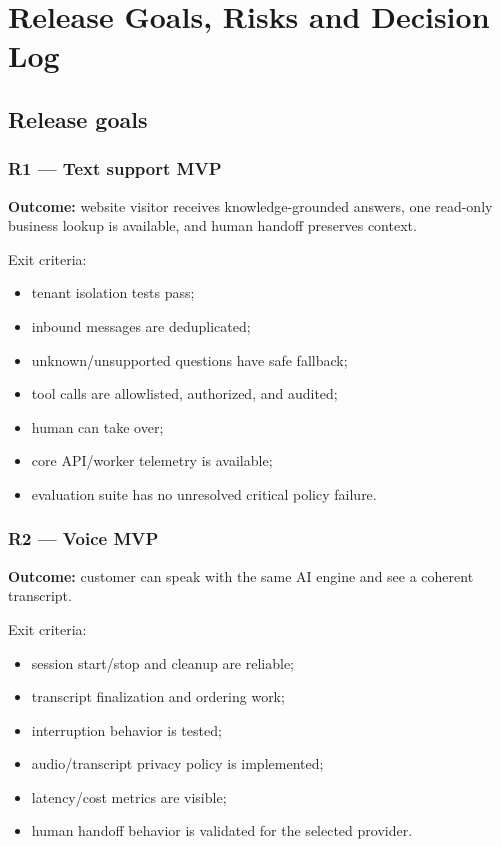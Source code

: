 \chapter{Release Goals, Risks and Decision Log}

\section{Release goals}

\subsection{R1 --- Text support MVP}

\textbf{Outcome:} website visitor receives knowledge-grounded answers, one read-only business lookup is available, and human handoff preserves context.

Exit criteria:

\begin{itemize}
\item tenant isolation tests pass;
\item inbound messages are deduplicated;
\item unknown/unsupported questions have safe fallback;
\item tool calls are allowlisted, authorized, and audited;
\item human can take over;
\item core API/worker telemetry is available;
\item evaluation suite has no unresolved critical policy failure.
\end{itemize}


\subsection{R2 --- Voice MVP}

\textbf{Outcome:} customer can speak with the same AI engine and see a coherent transcript.

Exit criteria:

\begin{itemize}
\item session start/stop and cleanup are reliable;
\item transcript finalization and ordering work;
\item interruption behavior is tested;
\item audio/transcript privacy policy is implemented;
\item latency/cost metrics are visible;
\item human handoff behavior is validated for the selected provider.
\end{itemize}


